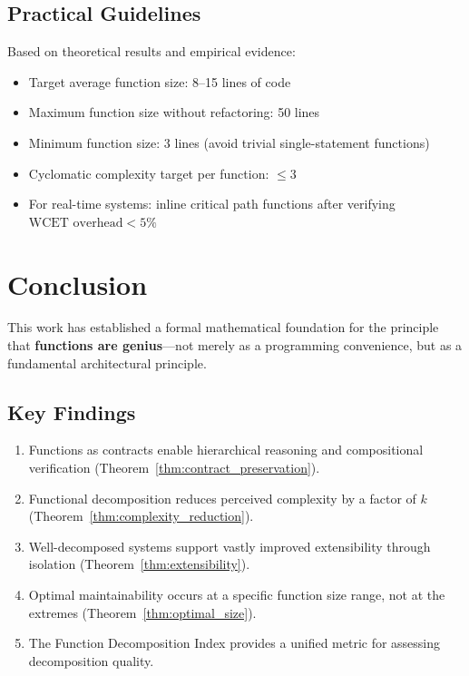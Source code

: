 \documentclass[a4paper,12pt]{article}
\theoremstyle{definition}
\begin{document}
\subsection{Practical Guidelines}

Based on theoretical results and empirical evidence:

\begin{itemize}
	\item Target average function size: 8--15 lines of code
	\item Maximum function size without refactoring: 50 lines
	\item Minimum function size: 3 lines (avoid trivial single-statement functions)
	\item Cyclomatic complexity target per function: $\leq 3$
	\item For real-time systems: inline critical path functions after verifying $\text{WCET overhead} < 5\%$
\end{itemize}

\section{Conclusion}

This work has established a formal mathematical foundation for the principle that \textbf{functions are genius}—not merely as a programming convenience, but as a fundamental architectural principle.

\subsection{Key Findings}

\begin{enumerate}
	\item Functions as contracts enable hierarchical reasoning and compositional verification (Theorem~\ref{thm:contract_preservation}).
	\item Functional decomposition reduces perceived complexity by a factor of $k$ (Theorem~\ref{thm:complexity_reduction}).
	\item Well-decomposed systems support vastly improved extensibility through isolation (Theorem~\ref{thm:extensibility}).
	\item Optimal maintainability occurs at a specific function size range, not at the extremes (Theorem~\ref{thm:optimal_size}).
	\item The Function Decomposition Index provides a unified metric for assessing decomposition quality.
\end{enumerate}
\end{document}
